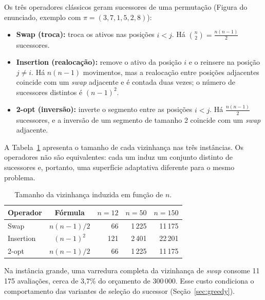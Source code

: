 Os três operadores clássicos geram sucessores de uma permutação (Figura do enunciado, exemplo com $\pi=(3,7,1,5,2,8)$):

\begin{itemize}
  \item \textbf{Swap (troca):} troca os ativos nas posições $i<j$. Há $\binom{n}{2}=\frac{n(n-1)}{2}$ sucessores.
  \item \textbf{Insertion (realocação):} remove o ativo da posição $i$ e o reinsere na posição $j\neq i$. Há $n(n-1)$ movimentos, mas a realocação entre posições adjacentes coincide com um \textit{swap} adjacente e é contada duas vezes; o número de sucessores distintos é $(n-1)^2$.
  \item \textbf{2-opt (inversão):} inverte o segmento entre as posições $i<j$. Há $\frac{n(n-1)}{2}$ sucessores, e a inversão de um segmento de tamanho 2 coincide com um \textit{swap} adjacente.
\end{itemize}

A Tabela~\ref{tab:vizinhanca} apresenta o tamanho de cada vizinhança nas três instâncias. Os operadores não são equivalentes: cada um induz um conjunto distinto de sucessores e, portanto, uma superfície adaptativa diferente para o mesmo problema.

\begin{table}[H]
\centering
\caption{Tamanho da vizinhança induzida em função de $n$.}
\label{tab:vizinhanca}
\small
\begin{tabular}{lcrrr}
\toprule
Operador & Fórmula & $n=12$ & $n=50$ & $n=150$\\
\midrule
Swap & $n(n-1)/2$ & 66 & 1\,225 & 11\,175\\
Insertion & $(n-1)^2$ & 121 & 2\,401 & 22\,201\\
2-opt & $n(n-1)/2$ & 66 & 1\,225 & 11\,175\\
\bottomrule
\end{tabular}
\end{table}

Na instância grande, uma varredura completa da vizinhança de \textit{swap} consome 11\,175 avaliações, cerca de 3{,}7\% do orçamento de 300\,000. Esse custo condiciona o comportamento das variantes de seleção do sucessor (Seção~\ref{sec:greedy}).